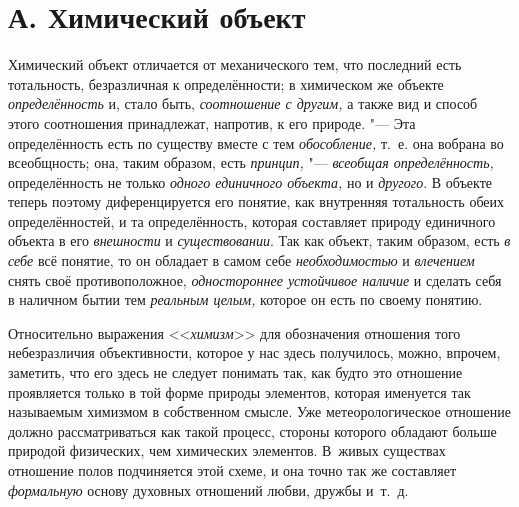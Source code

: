 \section[А. Химический объект]{А. Химический объект}

Химический объект отличается от механического тем, что
последний есть тотальность, безразличная к определённости; в химическом же
объекте {\em определённость}
и, стало быть,
{\em соотношение с другим,}
а также вид и способ этого соотношения принадлежат, напротив,
к его природе. "--- Эта определённость есть по существу вместе
с тем {\em обособление,}
т.~е. она вобрана во всеобщность; она, таким образом, есть
{\em принцип,} "---
{\em всеобщая определённость,}
определённость не только
{\em одного единичного объекта,}
но и {\em другого}.
В объекте теперь поэтому диференцируется его понятие, как
внутренняя тотальность обеих определённостей, и та определённость, которая
составляет природу единичного объекта в его
{\em внешности} и
{\em существовании}. Так
как объект, таким образом, есть {\em в
себе} всё понятие, то он обладает в самом себе
{\em необходимостью} и
{\em влечением} снять
своё противоположное, {\em одностороннее
устойчивое наличие} и сделать себя в наличном бытии тем
{\em реальным целым,}
которое он есть по своему понятию.

Относительно выражения
<<{\em химизм}>> для
обозначения отношения того небезразличия объективности, которое у нас здесь
получилось, можно, впрочем, заметить, что его здесь не следует понимать
так, как будто это отношение проявляется только в той форме природы
элементов, которая именуется так называемым химизмом в собственном смысле.
Уже метеорологическое отношение должно рассматриваться как такой процесс,
стороны которого обладают больше природой физических, чем химических
элементов. В~живых существах отношение полов подчиняется этой схеме, и она
точно так же составляет
{\em формальную} основу
духовных отношений любви, дружбы
и~т.~д.

